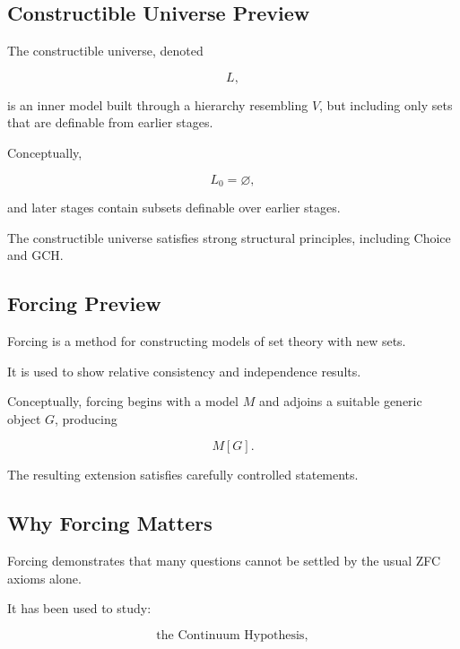 \subsection{Constructible Universe Preview}
\label{subsec:constructible-universe-preview}

The constructible universe, denoted

\[
\boxed{
L,
}
\]

is an inner model built through a hierarchy resembling \(V\), but including
only sets that are definable from earlier stages.

Conceptually,

\[
\boxed{
L_0=\varnothing,
}
\]

and later stages contain subsets definable over earlier stages.

The constructible universe satisfies strong structural principles,
including Choice and GCH.

\subsection{Forcing Preview}
\label{subsec:forcing-preview}

Forcing is a method for constructing models of set theory with new sets.

It is used to show relative consistency and independence results.

Conceptually, forcing begins with a model \(M\) and adjoins a suitable
generic object \(G\), producing

\[
\boxed{
M[G].
}
\]

The resulting extension satisfies carefully controlled statements.

\subsection{Why Forcing Matters}
\label{subsec:why-forcing-matters}

Forcing demonstrates that many questions cannot be settled by the usual ZFC
axioms alone.

It has been used to study:

\[
\boxed{
\text{the Continuum Hypothesis},
}
\]

